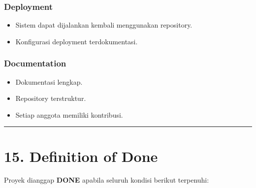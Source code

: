 \documentclass[
]{article}
\providecommand{\tightlist}{%
  \setlength{\itemsep}{0pt}\setlength{\parskip}{0pt}}
\begin{document}
\subsubsection{Deployment}\label{deployment}

\begin{itemize}
\tightlist
\item
  Sistem dapat dijalankan kembali menggunakan repository.
\item
  Konfigurasi deployment terdokumentasi.
\end{itemize}

\subsubsection{Documentation}\label{documentation}

\begin{itemize}
\tightlist
\item
  Dokumentasi lengkap.
\item
  Repository terstruktur.
\item
  Setiap anggota memiliki kontribusi.
\end{itemize}

\begin{center}\rule{0.5\linewidth}{0.5pt}\end{center}

\section{15. Definition of Done}\label{definition-of-done}

Proyek dianggap \textbf{DONE} apabila seluruh kondisi berikut terpenuhi:
\end{document}
